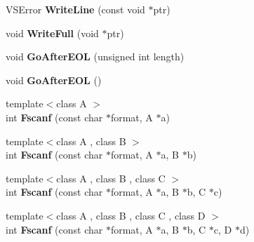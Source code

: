 \begin{DoxyCompactItemize}
\item 
V\+S\+Error {\bfseries Write\+Line} (const void $\ast$ptr)\hypertarget{classVSFileSystem_1_1VSFile_ab518975f8d3841a0b6a23094ae426948}{}\label{classVSFileSystem_1_1VSFile_ab518975f8d3841a0b6a23094ae426948}

\item 
void {\bfseries Write\+Full} (void $\ast$ptr)\hypertarget{classVSFileSystem_1_1VSFile_ace17537cc5ec8bf74c24460ae88100e0}{}\label{classVSFileSystem_1_1VSFile_ace17537cc5ec8bf74c24460ae88100e0}

\item 
void {\bfseries Go\+After\+E\+OL} (unsigned int length)\hypertarget{classVSFileSystem_1_1VSFile_ac2e5b018f7d41de31eb324d40099679d}{}\label{classVSFileSystem_1_1VSFile_ac2e5b018f7d41de31eb324d40099679d}

\item 
void {\bfseries Go\+After\+E\+OL} ()\hypertarget{classVSFileSystem_1_1VSFile_a5139a7e82bae19703a47cbd14c607fcd}{}\label{classVSFileSystem_1_1VSFile_a5139a7e82bae19703a47cbd14c607fcd}

\item 
{\footnotesize template$<$class A $>$ }\\int {\bfseries Fscanf} (const char $\ast$format, A $\ast$a)\hypertarget{classVSFileSystem_1_1VSFile_a5689b946403dbe92b5148c86a80bb1bd}{}\label{classVSFileSystem_1_1VSFile_a5689b946403dbe92b5148c86a80bb1bd}

\item 
{\footnotesize template$<$class A , class B $>$ }\\int {\bfseries Fscanf} (const char $\ast$format, A $\ast$a, B $\ast$b)\hypertarget{classVSFileSystem_1_1VSFile_ab5418fb2db39144084e45d5919b63d10}{}\label{classVSFileSystem_1_1VSFile_ab5418fb2db39144084e45d5919b63d10}

\item 
{\footnotesize template$<$class A , class B , class C $>$ }\\int {\bfseries Fscanf} (const char $\ast$format, A $\ast$a, B $\ast$b, C $\ast$c)\hypertarget{classVSFileSystem_1_1VSFile_aa7536c939f1c681da566cc2084a9577c}{}\label{classVSFileSystem_1_1VSFile_aa7536c939f1c681da566cc2084a9577c}

\item 
{\footnotesize template$<$class A , class B , class C , class D $>$ }\\int {\bfseries Fscanf} (const char $\ast$format, A $\ast$a, B $\ast$b, C $\ast$c, D $\ast$d)\hypertarget{classVSFileSystem_1_1VSFile_a00ccb7b6193152bbfccb94532853e431}{}\label{classVSFileSystem_1_1VSFile_a00ccb7b6193152bbfccb94532853e431}


\end{DoxyCompactItemize}
